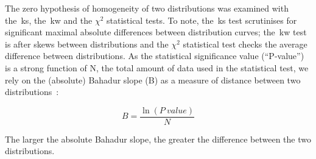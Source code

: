 The zero hypothesis of homogeneity of two distributions was examined with the~\gls{ks}, the~\gls{kw} and the \({\chi}^{2}\) statistical tests.
To note, the~\gls{ks} test scrutinises for significant maximal absolute differences between distribution curves; the~\gls{kw} test is after skews between distributions and the \({\chi}^{2}\) statistical test checks the average difference between distributions.
As the statistical significance value (``P‑value'') is a strong function of N, the total amount of data used in the statistical test, we rely on the (absolute) Bahadur slope (B) as a measure of distance between two distributions~\cite{Bahadur1967, Bahadur1971}:

\begin{equation} \label{eq:bahadur}
B=\frac{\ln(P~value)}{N}
\end{equation}

The larger the absolute Bahadur slope, the greater the difference between the two distributions.
